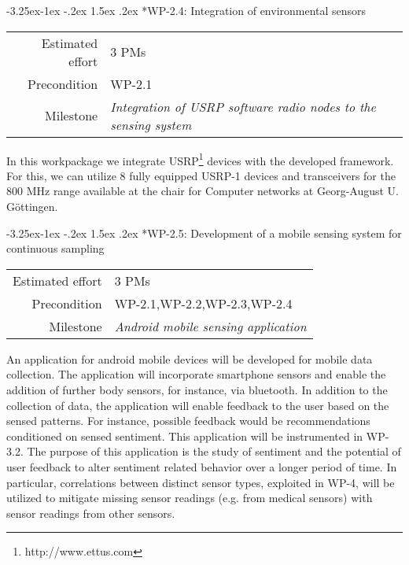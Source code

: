 \documentclass[12pt]{article}
\makeatletter
\newcommand{\kobyc}[1]{\begin{center}\fbox{\parbox{3in}{{\textcolor{green}{K: #1}}}}\end{center}}
\renewcommand\paragraph{\@startsection{paragraph}{4}{\z@}%
  {-3.25ex\@plus -1ex \@minus -.2ex}%
  {1.5ex \@plus .2ex}%
  {\normalfont\normalsize\bfseries}}
\makeatother
\begin{document}

\paragraph*{WP-2.4: Integration of environmental sensors}
\begin{tabular}{rl}
 Estimated effort& 3 PMs\\
 Precondition & WP-2.1\\
 Milestone & \begin{minipage}[t]{12.2cm}
\textit{Integration of USRP software radio nodes to the  sensing system}\vspace{.2cm}
             \end{minipage}
\end{tabular}

\noindent
In this workpackage we integrate USRP\footnote{http://www.ettus.com} devices with the developed framework. 
For this, we can utilize 8 fully equipped USRP-1 devices and transceivers for the 800 MHz range available at the chair for Computer networks at Georg-August U. Göttingen.


\paragraph*{WP-2.5: Development of a mobile sensing system for continuous sampling}
\begin{tabular}{rl}
 Estimated effort& 3 PMs\\
 Precondition & WP-2.1,WP-2.2,WP-2.3,WP-2.4\\
 Milestone & \begin{minipage}[t]{12.2cm}
\textit{Android mobile sensing application}\vspace{.2cm}
             \end{minipage}
\end{tabular}

\noindent
An application for android mobile devices will be developed for mobile data collection. 
The application will incorporate smartphone sensors and enable the addition of further body sensors, for instance, via bluetooth.
In addition to the collection of data, the application will enable feedback to the user based on the sensed patterns. 
For instance, possible feedback would be recommendations conditioned on sensed sentiment.  
This application will be instrumented in WP-3.2.
The purpose of this application is the study of sentiment and the potential of user feedback to alter sentiment related behavior over a longer period of time. 
In particular, correlations between distinct sensor types, exploited in WP-4, will be utilized to mitigate missing sensor readings (e.g. from medical sensors) with sensor readings from other sensors.  
\end{document}
